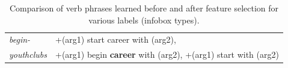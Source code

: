 \begin{table}[t]
\begin{scriptsize}
\begin{center}
\begin{tabular}{|l|l|}
\hline
\textit{begin-} &+(arg1) start career with (arg2), \\
\textit{youthclubs}& +(arg1) begin \textbf{career} with (arg2), +(arg1) start with (arg2) \\
\hline
\end{tabular}
\caption{\label{table:verbs} Comparison of verb phrases learned before and after feature selection for various labels (infobox types).}
\end{center}
\end{scriptsize}
\end{table}
\normalsize
